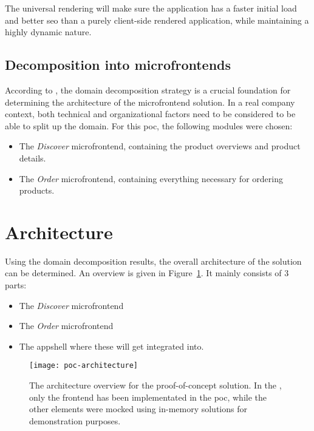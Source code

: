 The universal rendering will make sure the application has a faster initial load
and better \gls{seo} than a purely client-side rendered application, while
maintaining a highly dynamic nature.

\subsection{Decomposition into microfrontends}

According to \textcite{Rappl_2021}, the domain decomposition strategy is a
crucial foundation for determining the architecture of the \gls{microfrontend}
solution. In a real company context, both technical and organizational factors
need to be considered to be able to split up the domain. For this \gls{poc}, the
following modules were chosen:

\begin{itemize}
  \item The \textit{Discover} \gls{microfrontend}, containing the product
  overviews and product details.
  \item The \textit{Order} \gls{microfrontend}, containing everything necessary
  for ordering products.
\end{itemize}

\section{Architecture}

Using the domain decomposition results, the overall architecture of the solution
can be determined. An overview is given in Figure~\ref{fig:poc-architecture}. It
mainly consists of 3 parts:
\begin{itemize}
  \item The \textit{Discover} \gls{microfrontend}
  \item The \textit{Order} \gls{microfrontend}
  \item The \gls{appshell} where these  will
  get integrated into.
\end{itemize}
 

\begin{figure}
  \centering
  \texttt{[image: poc-architecture]}
  \caption[Architecture overview for proof-of-concept solution]{The architecture
  overview for the proof-of-concept solution. In the ,
  only the \gls{frontend} has been implementated in the \gls{poc}, while the
  other elements were mocked using in-memory solutions for demonstration
  purposes.  }
  \label{fig:poc-architecture}
\end{figure}


